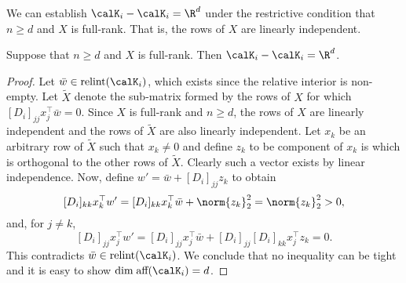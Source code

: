 \documentclass{article}
\begin{document}
We can establish \( \calK_i - \calK_i = \R^d \) under the restrictive condition that \( n \geq d \) and \( X \) is full-rank.
That is, the rows of \( X \) are linearly independent.
\begin{proposition}
	Suppose that \( n \geq d \) and \( X \) is full-rank.
	Then \( \calK_i - \calK_i = \R^d \).
\end{proposition}
\begin{proof}
	Let \( \bar w \in \text{relint} (\calK_i) \), which exists since the relative interior is non-empty.
	Let \( \tilde X \) denote the sub-matrix formed by the rows of \( X \) for which \( [D_i]_{jj} x_j^\top \bar w = 0 \).
	Since \( X \) is full-rank and \( n \geq d \), the rows of \( X \) are linearly independent and the rows of \( \tilde X \) are also linearly independent.
	Let \( x_k \) be an arbitrary row of \( \tilde X \) such that \( x_k \neq 0 \) and define \( z_k \) to be component of \( x_k \) is which is orthogonal to the other rows of \( \tilde X \).
	Clearly such a vector exists by linear independence.
	Now, define \( w' = \bar w + [D_i]_{jj} z_k \) to obtain
	\[
		[D_i]_{kk} x_k^\top w' = [D_i]_{kk} x_k^\top \bar w + \norm{z_k}_2^2 = \norm{z_k}_2^2 > 0,
	\]
	and, for \( j \neq k \),
	\[
		[D_i]_{jj} x_j^\top w' = [D_i]_{jj} x_{j}^\top \bar w +  [D_i]_{jj} [D_i]_{kk} x_{j}^\top z_k = 0.
	\]
	This contradicts \( \bar w \in \text{relint} (\calK_i) \).
	We conclude that no inequality can be tight and it is easy to show \( \text{dim} \; \text{aff} (\calK_i) = d \).
\end{proof}

\printbibliography[]
\end{document}
